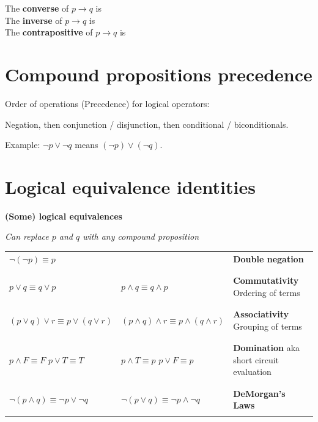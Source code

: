 \documentclass[12pt, oneside]{article}
\begin{document}
The {\bf converse}  of $p \to q$ is \underline{}\\

The {\bf inverse}  of $p \to q$ is \underline{}\\

The {\bf contrapositive}  of $p \to q$ is \underline{} \\
 \vfill
\section*{Compound propositions precedence}


Order of operations (Precedence) for logical operators: 

Negation, then conjunction / disjunction, then conditional / biconditionals.

Example: $\lnot p \lor \lnot q$ means $(\lnot p) \lor (\lnot q)$.
 \vfill
\section*{Logical equivalence identities}


{\bf (Some) logical equivalences}

{\it Can replace $p$ and $q$ with any compound proposition}

\begin{tabular}{llp{3in}}
$\lnot ( \lnot p) \equiv p$ & & {\bf Double negation}\\
&& \\
&& \\
$p \lor q \equiv q \lor p$ & $p \land q \equiv q \land p$ & {\bf Commutativity} Ordering of terms\\
&& \\
&& \\
$(p \lor q) \lor r  \equiv p \lor (q \lor r)$ & $(p \land q) \land r  \equiv p \land (q \land r)$ & {\bf Associativity} Grouping of terms\\
&& \\
&& \\
$p \land F \equiv F$ \qquad $p \lor T \equiv T$ & $p \land T \equiv p$ \qquad $p \lor F \equiv p$ & {\bf Domination} aka 
short circuit evaluation\\
&& \\
&& \\
$\lnot (p \land q) \equiv \lnot p \lor \lnot q$ & $\lnot (p \lor q) \equiv \lnot p \land\lnot q$  & {\bf DeMorgan's Laws}\\
&& \\
\end{tabular}
\end{document}
